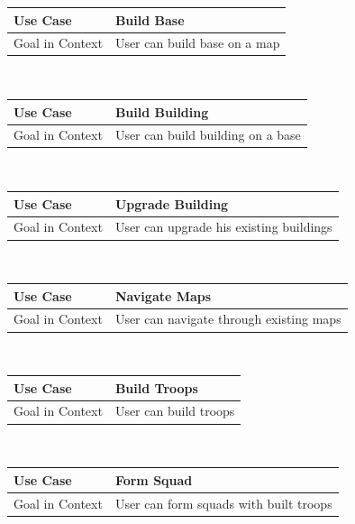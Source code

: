\documentclass[a4paper]{article}
\begin{document}
\begin{tabular}[t]{|l|l|l|}
\hline
\textbf{Use Case}	&	\multicolumn{2}{|l|}{\textbf{Build Base}}\\
\hline
Goal in Context	&	\multicolumn{2}{|l|}{User can build base on a map}\\
\hline
\end{tabular}\\

\begin{tabular}[t]{|l|l|l|}
\hline
\textbf{Use Case}	&	\multicolumn{2}{|l|}{\textbf{Build Building}}\\
\hline
Goal in Context	&	\multicolumn{2}{|l|}{User can build building on a base}\\
\hline
\end{tabular}\\

\begin{tabular}[t]{|l|l|l|}
\hline
\textbf{Use Case}	&	\multicolumn{2}{|l|}{\textbf{Upgrade Building}}\\
\hline
Goal in Context	&	\multicolumn{2}{|l|}{User can upgrade his existing buildings}\\
\hline
\end{tabular}\\

\begin{tabular}[t]{|l|l|l|}
\hline
\textbf{Use Case}	&	\multicolumn{2}{|l|}{\textbf{Navigate Maps}}\\
\hline
Goal in Context	&	\multicolumn{2}{|l|}{User can navigate through existing maps}\\
\hline
\end{tabular}\\

\begin{tabular}[t]{|l|l|l|}
\hline
\textbf{Use Case}	&	\multicolumn{2}{|l|}{\textbf{Build Troops}}\\
\hline
Goal in Context	&	\multicolumn{2}{|l|}{User can build troops}\\
\hline
\end{tabular}\\

\begin{tabular}[t]{|l|l|l|}
\hline
\textbf{Use Case}	&	\multicolumn{2}{|l|}{\textbf{Form Squad}}\\
\hline
Goal in Context	&	\multicolumn{2}{|l|}{User can form squads with built troops}\\
\hline
\end{tabular}\\
\end{document}
